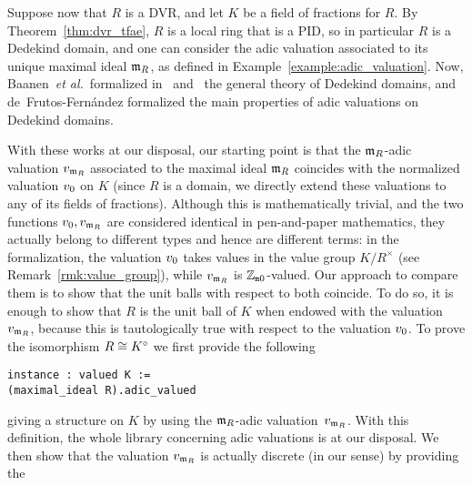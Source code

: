 \documentclass[sigplan,10pt,anonymous,review]{acmart}
\begin{document}
Suppose now that $R$ is a DVR, and let $K$ be a field of fractions for $R$. By Theorem~\ref{thm:dvr_tfae}, $R$ is a local ring that is a PID, so in particular $R$ is a Dedekind domain, and one can consider the adic valuation associated to its unique maximal ideal $\mathfrak{m}_{R}$, as defined in Example~\ref{example:adic_valuation}. Now, Baanen~\emph{et al.}~formalized in~\cite{BaaDahNarNuc21} and~\cite{BaaDahNarNuc22} the general theory of Dedekind domains, and de~Frutos-Fernández formalized \cite{deF22} the main properties of adic valuations on Dedekind domains.

With these works at our disposal, our starting point is that the $\mathfrak{m}_{R}$-adic valuation $v_{\mathfrak{m}_{R}}$ associated to the maximal ideal $\mathfrak{m}_{R}$ coincides with the normalized valuation ${v}_{0}$ on $K$ (since $R$ is a domain, we directly extend these valuations to any of its fields of fractions). Although this is mathematically trivial, and the two functions ${v}_{0},v_{\mathfrak{m}_{R}}$ 
are considered identical in pen-and-paper mathematics, they actually belong to different types and hence are different terms: in the \mathlib formalization, the valuation ${v}_{0}$ takes values\href{https://leanprover-community.github.io/mathlib_docs/ring_theory/valuation/valuation_subring.html#valuation_subring.valuation}{\extlink} in the value group $K/R^\times$ (see Remark~\ref{rmk:value_group}), while $v_{\mathfrak{m}_{R}}$ is $\mathbb{Z}_{\mathtt{m}0}$-valued\href{https://leanprover-community.github.io/mathlib_docs/ring_theory/dedekind_domain/adic_valuation.html#is_dedekind_domain.height_one_spectrum.valuation}{\extlink}. Our approach to compare them is to show that the unit balls with respect to both coincide. To do so, it is enough to show that $R$ is the unit ball of $K$ when endowed with the valuation $v_{\mathfrak{m}_{R}}$, because this is tautologically true with respect to the valuation ${v}_{0}$. To prove the isomorphism $R\cong {K}^\circ$ we first provide the following\href{https://github.com/LCFT-Lean/local_fields/blob/76ad487d09babdb0018f394a5634526637ee014a/src/discrete_valuation_ring/basic.lean#L452}{\extlink}
\begin{lstlisting}[caption={The \code{valued} instance on the field of frations of a DVR}, label={code:valued_DVR}]
instance : valued K :=
(maximal_ideal R).adic_valued
\end{lstlisting}
giving a  structure on $K$ by using the $\mathfrak{m}_{R}$-adic valuation~$v_{\mathfrak{m}_{R}}$. With this definition, the whole library concerning adic valuations is at our disposal. We then show that the valuation $v_{\mathfrak{m}_{R}}$ is actually discrete (in our sense)  by providing the\href{https://github.com/LCFT-Lean/local_fields/blob/76ad487d09babdb0018f394a5634526637ee014a/src/discrete_valuation_ring/basic.lean#L454}{\extlink}
\end{document}
